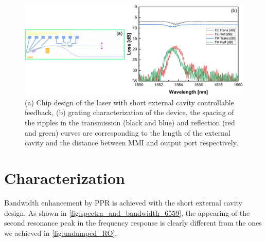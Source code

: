 \begin{figure}[ht]
    \centering
    \includegraphics[width=\linewidth]{figures/grating_6559.png}
    \caption{(a) Chip design of the laser with short external cavity controllable feedback, (b) grating characterization of the device, the spacing of the ripples in the transmission (black and blue) and reflection (red and green) curves are corresponding to the length of the external cavity and the distance between MMI and output port respectively.}
    \label{fig:grating_6559}
\end{figure}


\section{Characterization}


Bandwidth enhancement by PPR is achieved with the short external cavity design. As shown in \autoref{fig:spectra_and_bandwidth_6559}, the appearing of the second resonance peak in the frequency response is clearly different from the ones we achieved in \autoref{fig:undamped_RO}.

